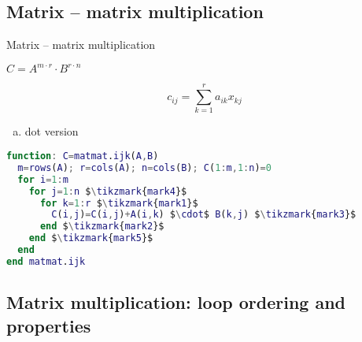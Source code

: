 
\lstset{
  mathescape = true,
  basicstyle = \ttfamily}
\newcommand{\dollar}{\mbox{\textdollar}}

\subsection{Matrix -- matrix multiplication}

\begin{frame}[fragile]{Matrix -- matrix multiplication}

$C = A^{m\cdot r}\cdot B^{r\cdot n} $

$$ c_{i j} = \sum_{k=1}^r a_{i k}  x_{k j} $$
\begin{enumerate}[a)]
  \item dot version
\end{enumerate}

\scriptsize{
\begin{lstlisting}[belowskip=-1.4 \baselineskip, language=Matlab, mathescape]
function: C=matmat.ijk(A,B)
  m=rows(A); r=cols(A); n=cols(B); C(1:m,1:n)=0
  for i=1:m
    for j=1:n $\tikzmark{mark4}$
      for k=1:r $\tikzmark{mark1}$
        C(i,j)=C(i,j)+A(i,k) $\cdot$ B(k,j) $\tikzmark{mark3}$
      end $\tikzmark{mark2}$
    end $\tikzmark{mark5}$
  end
end matmat.ijk
\end{lstlisting}
}
\end{frame}

\subsection{Matrix multiplication: loop ordering and properties}

